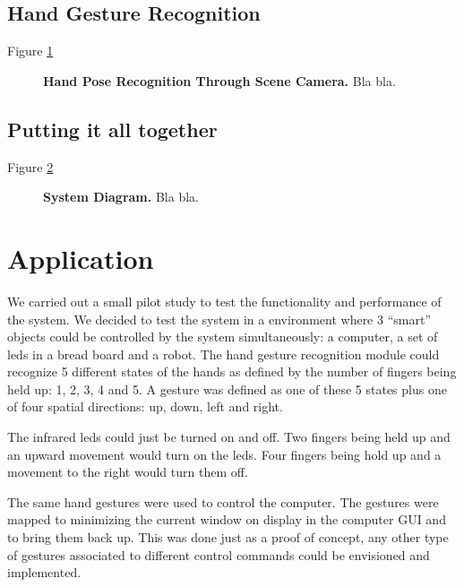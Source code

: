\documentclass[jou,a4paper,notxfonts]{apa}
\begin{document}
\subsection{Hand Gesture Recognition}

Figure \ref{hand}

\begin{figure}[tp]
 \caption{\textbf{Hand Pose Recognition Through Scene Camera.} Bla bla.}
 \label{hand}
\end{figure}

\subsection{Putting it all together}
Figure \ref{systemDiagram}

\begin{figure}[tp]
 \caption{\textbf{System Diagram.} Bla bla.}
 \label{systemDiagram}
\end{figure}


\section{Application}
We carried out a small pilot study to test the functionality and performance of the system. We decided to test the
system in a environment where 3 ``smart'' objects could be controlled by the system simultaneously: a computer, a set of
leds in a bread board and a robot. The hand gesture recognition module could recognize 5 different states of the hands
as defined by the number of fingers being held up: 1, 2, 3, 4 and 5. A gesture was defined as one of these 5 states plus
one of four spatial directions: up, down, left and right.

The infrared leds could just be turned on and off. Two fingers being held up and an upward movement would turn on the
leds. Four fingers being hold up and a movement to the right would turn them off.

The same hand gestures were used to control the computer. The gestures were mapped to minimizing the current window on
display in the computer GUI and to bring them back up. This was done just as a proof of concept, any other type of
gestures associated to different control commands could be envisioned and implemented.
\end{document}

